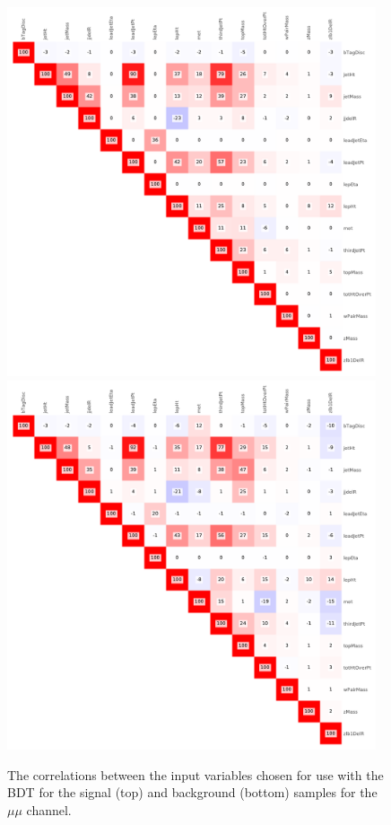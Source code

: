 \begin{figure}[htbp]
\centering
\includegraphics[width=0.97\textwidth]{figs/background-estimation/plots/corr_sig_mumu.pdf}
\\
\includegraphics[width=0.97\textwidth]{figs/background-estimation/plots/corr_bkg_mumu.pdf}
\caption{
The correlations between the input variables chosen for use with the BDT for the signal (top) and background (bottom) samples for the $\mu\mu$ channel.}
\label{fig:corr_mumu}
\end{figure}

